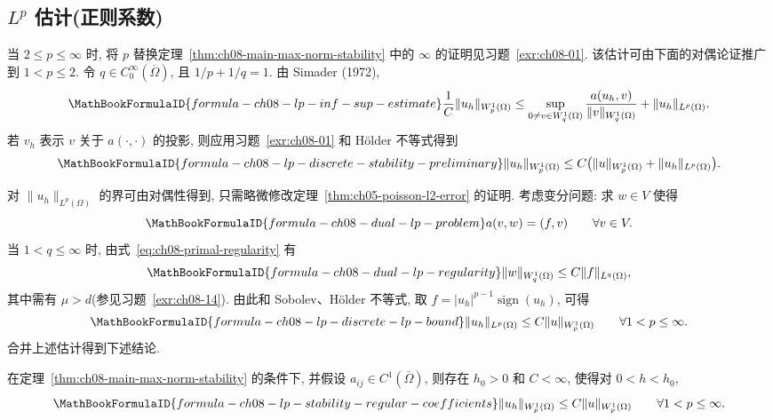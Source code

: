 \subsection{$L^p$ 估计(正则系数)}
\label{sec:ch08-lp-estimates-regular-coefficients}
\setcounter{thmcount}{0}
\setcounter{equation}{0}

当 $2\leq p\leq\infty$ 时, 将 $p$ 替换定理~\ref{thm:ch08-main-max-norm-stability} 中的 $\infty$ 的证明见习题~\ref{exr:ch08-01}. 该估计可由下面的对偶论证推广到 $1<p\leq2$. 令 $q\in C_0^\infty(\overline\Omega)$, 且 $1/p+1/q=1$. 由 Simader (1972),
\[
\MathBookFormulaID{formula-ch08-lp-inf-sup-estimate}
\frac1C\|u_h\|_{W_p^1(\Omega)}
\leq\sup_{0\neq v\in W_q^1(\Omega)}\frac{a(u_h,v)}{\|v\|_{W_q^1(\Omega)}}
+\|u_h\|_{L^p(\Omega)}.
\]
若 $v_h$ 表示 $v$ 关于 $a(\cdot,\cdot)$ 的投影, 则应用习题~\ref{exr:ch08-01} 和 Hölder 不等式得到
\[
\MathBookFormulaID{formula-ch08-lp-discrete-stability-preliminary}
\|u_h\|_{W_p^1(\Omega)}\leq C\bigl(\|u\|_{W_p^1(\Omega)}+\|u_h\|_{L^p(\Omega)}\bigr).
\]

对 $\|u_h\|_{L^p(\Omega)}$ 的界可由对偶性得到, 只需略微修改定理~\ref{thm:ch05-poisson-l2-error} 的证明. 考虑变分问题: 求 $w\in V$ 使得
\begin{equation}
\MathBookFormulaID{formula-ch08-dual-lp-problem}
\label{eq:ch08-dual-lp-problem}
a(v,w)=(f,v)
\qquad\forall v\in V.
\end{equation}
当 $1<q\leq\infty$ 时, 由式~\eqref{eq:ch08-primal-regularity} 有
\begin{equation}
\MathBookFormulaID{formula-ch08-dual-lp-regularity}
\label{eq:ch08-dual-lp-regularity}
\|w\|_{W_q^1(\Omega)}\leq C\|f\|_{L^q(\Omega)},
\end{equation}
其中需有 $\mu>d$(参见习题~\ref{exr:ch08-14}). 由此和 Sobolev、Hölder 不等式, 取 $f=|u_h|^{p-1}\operatorname{sign}(u_h)$, 可得
\[
\MathBookFormulaID{formula-ch08-lp-discrete-lp-bound}
\|u_h\|_{L^p(\Omega)}\leq C\|u\|_{W_p^1(\Omega)}
\qquad\forall 1<p\leq\infty.
\]
合并上述估计得到下述结论.

\begin{Theorem}
\label{thm:ch08-lp-stability-regular-coefficients}
在定理~\ref{thm:ch08-main-max-norm-stability} 的条件下, 并假设 $a_{ij}\in C^1(\overline\Omega)$, 则存在 $h_0>0$ 和 $C<\infty$, 使得对 $0<h<h_0$,
\[
\MathBookFormulaID{formula-ch08-lp-stability-regular-coefficients}
\|u_h\|_{W_p^1(\Omega)}\leq C\|u\|_{W_p^1(\Omega)}
\qquad\forall 1<p\leq\infty.
\]
\end{Theorem}

